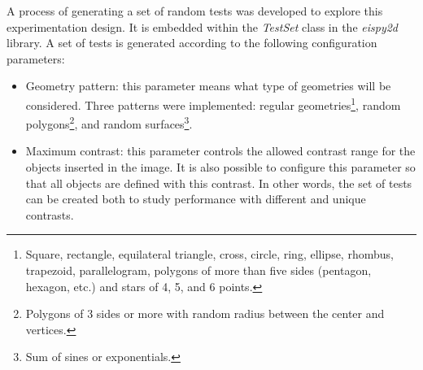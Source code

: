 			A process of generating a set of random tests was developed to explore this experimentation design. It is embedded within the \textit{TestSet} class in the \textit{eispy2d} library. A set of tests is generated according to the following configuration parameters:
			\begin{itemize}
				\item Geometry pattern: this parameter means what type of geometries will be considered. Three patterns were implemented: regular geometries\footnote{Square, rectangle, equilateral triangle, cross, circle, ring, ellipse, rhombus, trapezoid, parallelogram, polygons of more than five sides (pentagon, hexagon, etc.) and stars of 4, 5, and 6 points.}, random polygons\footnote{Polygons of 3 sides or more with random radius between the center and vertices.}, and random surfaces\footnote{Sum of sines or exponentials.}.
				\item Maximum contrast: this parameter controls the allowed contrast range for the objects inserted in the image. It is also possible to configure this parameter so that all objects are defined with this contrast. In other words, the set of tests can be created both to study performance with different and unique contrasts.

\end{itemize}
